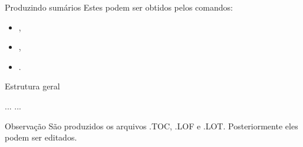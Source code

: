 \begin{frame}{Produzindo sumários}
Estes podem ser obtidos pelos comandos: 
\begin{itemize}
\item {},
\item {}, 
\item {}.
\end{itemize}
\end{frame}

\begin{frame}{Estrutura geral}
\begin{LaTeXcode}
\n
...\n
{}\n
{}\n
{}\n
{}\n
{}\n
{}\n
...\n
{}
\end{LaTeXcode}

\begin{block}{Observação}
São produzidos os arquivos .TOC, .LOF e .LOT. Posteriormente eles podem ser editados.
\end{block}
\end{frame}